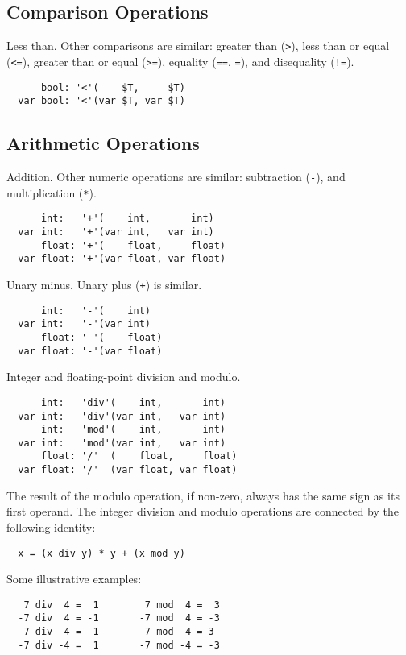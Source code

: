 \documentclass[10pt]{scrartcl}
\newcommand{\pjs}[1]{\textcolor{blue}{PJS:#1}}
\begin{document}
\newcommand{\builtin}{\noindent}

\subsection{Comparison Operations}
\builtin{}
Less than.  Other comparisons are similar:
greater than (\texttt{>}),
less than or equal (\texttt{<=}),
greater than or equal (\texttt{>=}),
equality (\texttt{==}, \texttt{=}),
and disequality (\texttt{!=}).
\begin{verbatim}
      bool: '<'(    $T,     $T)
  var bool: '<'(var $T, var $T)
\end{verbatim}

\subsection{Arithmetic Operations}
\builtin{}
Addition.  Other numeric operations are similar:
subtraction (\texttt{-}), and
multiplication (\texttt{*}).
\begin{verbatim}
      int:   '+'(    int,       int)
  var int:   '+'(var int,   var int)
      float: '+'(    float,     float)
  var float: '+'(var float, var float)
\end{verbatim}

\builtin{}
Unary minus.  Unary plus (\texttt{+}) is similar.
\begin{verbatim}
      int:   '-'(    int)
  var int:   '-'(var int)
      float: '-'(    float)
  var float: '-'(var float)
\end{verbatim}

\builtin{}
Integer and floating-point division and modulo.
\begin{verbatim}
      int:   'div'(    int,       int)
  var int:   'div'(var int,   var int)
      int:   'mod'(    int,       int)
  var int:   'mod'(var int,   var int)
      float: '/'  (    float,     float)
  var float: '/'  (var float, var float)
\end{verbatim}
The result of the modulo operation, if non-zero, always has the same sign as
its first operand.  The integer division and modulo operations are connected
by the following identity:
\begin{verbatim}
  x = (x div y) * y + (x mod y)
\end{verbatim}
Some illustrative examples:
\begin{verbatim}
   7 div  4 =  1        7 mod  4 =  3
  -7 div  4 = -1       -7 mod  4 = -3 
   7 div -4 = -1        7 mod -4 = 3
  -7 div -4 =  1       -7 mod -4 = -3
\end{verbatim}
\end{document}
